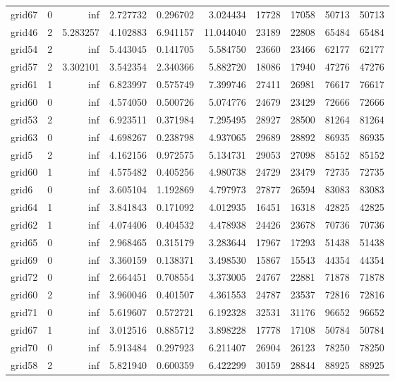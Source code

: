 \begin{longtable}{|l|r|r|r|r|r|r|r|r|r|}
grid67 & 0 & inf & 2.727732 & 0.296702 & 3.024434 & 17728 & 17058 & 50713 & 50713 \\
grid46 & 2 & 5.283257 & 4.102883 & 6.941157 & 11.044040 & 23189 & 22808 & 65484 & 65484 \\
grid54 & 2 & inf & 5.443045 & 0.141705 & 5.584750 & 23660 & 23466 & 62177 & 62177 \\
grid57 & 2 & 3.302101 & 3.542354 & 2.340366 & 5.882720 & 18086 & 17940 & 47276 & 47276 \\
grid61 & 1 & inf & 6.823997 & 0.575749 & 7.399746 & 27411 & 26981 & 76617 & 76617 \\
grid60 & 0 & inf & 4.574050 & 0.500726 & 5.074776 & 24679 & 23429 & 72666 & 72666 \\
grid53 & 2 & inf & 6.923511 & 0.371984 & 7.295495 & 28927 & 28500 & 81264 & 81264 \\
grid63 & 0 & inf & 4.698267 & 0.238798 & 4.937065 & 29689 & 28892 & 86935 & 86935 \\
grid5 & 2 & inf & 4.162156 & 0.972575 & 5.134731 & 29053 & 27098 & 85152 & 85152 \\
grid60 & 1 & inf & 4.575482 & 0.405256 & 4.980738 & 24729 & 23479 & 72735 & 72735 \\
grid6 & 0 & inf & 3.605104 & 1.192869 & 4.797973 & 27877 & 26594 & 83083 & 83083 \\
grid64 & 1 & inf & 3.841843 & 0.171092 & 4.012935 & 16451 & 16318 & 42825 & 42825 \\
grid62 & 1 & inf & 4.074406 & 0.404532 & 4.478938 & 24426 & 23678 & 70736 & 70736 \\
grid65 & 0 & inf & 2.968465 & 0.315179 & 3.283644 & 17967 & 17293 & 51438 & 51438 \\
grid69 & 0 & inf & 3.360159 & 0.138371 & 3.498530 & 15867 & 15543 & 44354 & 44354 \\
grid72 & 0 & inf & 2.664451 & 0.708554 & 3.373005 & 24767 & 22881 & 71878 & 71878 \\
grid60 & 2 & inf & 3.960046 & 0.401507 & 4.361553 & 24787 & 23537 & 72816 & 72816 \\
grid71 & 0 & inf & 5.619607 & 0.572721 & 6.192328 & 32531 & 31176 & 96652 & 96652 \\
grid67 & 1 & inf & 3.012516 & 0.885712 & 3.898228 & 17778 & 17108 & 50784 & 50784 \\
grid70 & 0 & inf & 5.913484 & 0.297923 & 6.211407 & 26904 & 26123 & 78250 & 78250 \\
grid58 & 2 & inf & 5.821940 & 0.600359 & 6.422299 & 30159 & 28844 & 88925 & 88925 \\

\end{longtable}
